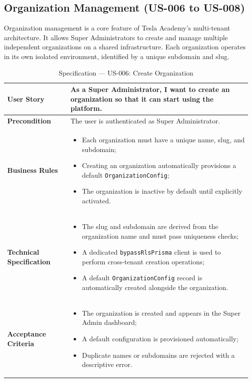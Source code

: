 \subsection{Organization Management (US-006 to US-008)}
Organization management is a core feature of Tesla Academy’s multi-tenant architecture. It allows Super Administrators to create and manage multiple independent organizations on a shared infrastructure. Each organization operates in its own isolated environment, identified by a unique subdomain and slug.

\begin{table}[H]
\centering
\caption{Specification — US-006: Create Organization}
\label{tab:us006}
\renewcommand{\arraystretch}{1}
\begin{tabularx}{\textwidth}{|p{2.5cm}|X|}
\hline
\textbf{User Story} & As a Super Administrator, I want to create an organization so that it can start using the platform. \\
\hline
\textbf{Precondition} & The user is authenticated as Super Administrator. \\
\hline
\textbf{Business Rules} &
\begin{itemize}
  \item Each organization must have a unique name, slug, and subdomain;
  \item Creating an organization automatically provisions a default \texttt{OrganizationConfig};
  \item The organization is inactive by default until explicitly activated.
\end{itemize} \\
\hline
\textbf{Technical Specification} &
\begin{itemize}
  \item The slug and subdomain are derived from the organization name and must pass uniqueness checks;
  \item A dedicated \texttt{bypassRlsPrisma} client is used to perform cross-tenant creation operations;
  \item A default \texttt{OrganizationConfig} record is automatically created alongside the organization.
\end{itemize} \\
\hline
\textbf{Acceptance Criteria} &
\begin{itemize}
  \item The organization is created and appears in the Super Admin dashboard;
  \item A default configuration is provisioned automatically;
  \item Duplicate names or subdomains are rejected with a descriptive error.
\end{itemize} \\
\hline
\end{tabularx}
\end{table}

